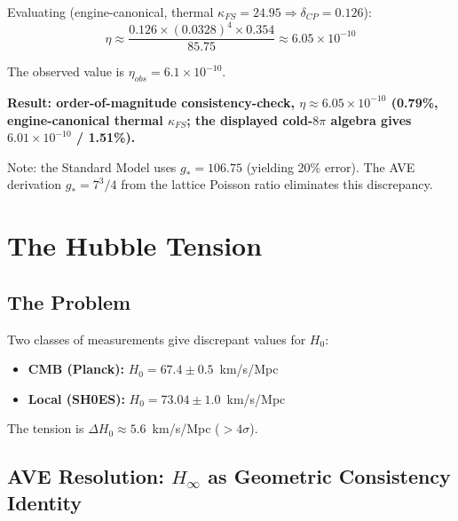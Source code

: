 Evaluating (engine-canonical, thermal $\kappa_{FS} = 24.95 \Rightarrow
\delta_{CP} = 0.126$):
\begin{equation}
    \eta \approx \frac{0.126 \times (0.0328)^4 \times 0.354}{85.75}
    \approx 6.05 \times 10^{-10}
\end{equation}

The observed value is $\eta_{obs} = 6.1 \times 10^{-10}$.

\medskip\noindent
\textbf{Result: order-of-magnitude consistency-check,
$\eta \approx 6.05 \times 10^{-10}$ (0.79\%, engine-canonical thermal
$\kappa_{FS}$; the displayed cold-$8\pi$ algebra gives
$6.01 \times 10^{-10}$ / 1.51\%).}  %

\medskip\noindent
Note: the Standard Model uses $g_* = 106.75$ (yielding 20\% error).
The AVE derivation $g_* = 7^3/4$ from the lattice Poisson ratio
eliminates this discrepancy.

\section{The Hubble Tension}
\label{sec:hubble_tension}

\subsection{The Problem}

Two classes of measurements give discrepant values for $H_0$:
\begin{itemize}
    \item \textbf{CMB (Planck):} $H_0 = 67.4 \pm 0.5$~km/s/Mpc
    \item \textbf{Local (SH0ES):} $H_0 = 73.04 \pm 1.0$~km/s/Mpc
\end{itemize}
The tension is $\Delta H_0 \approx 5.6$~km/s/Mpc ($>4\sigma$).

\subsection{AVE Resolution: $H_\infty$ as Geometric Consistency Identity}

